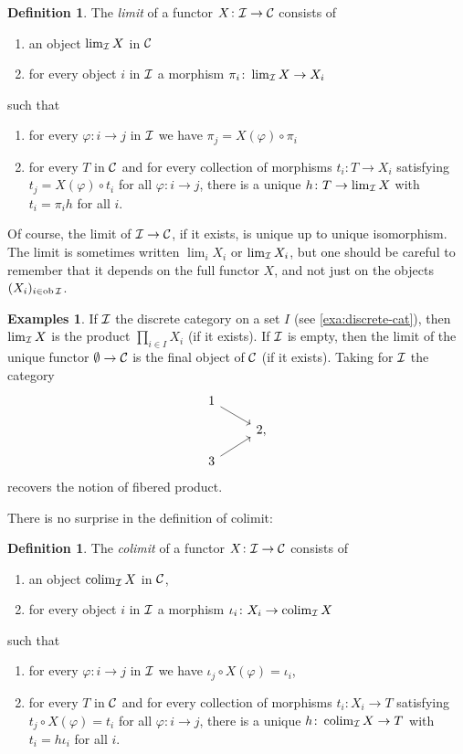 \documentclass[11pt]{amsbook}
\DeclareMathOperator\ob{ob}
\DeclareMathOperator\colim{colim}
\theoremstyle{plain}
\theoremstyle{definition}
\newtheorem{definition}[theorem]{Definition}
\newtheorem{examples}[theorem]{Examples}
\begin{document}
\begin{definition}The \emph{limit} of a functor $X\colon {\mathcal{I}} \to {\mathcal{C}}$  consists of
\begin{enumerate}
\item an object $\lim_{\mathcal{I}} X$ in ${\mathcal{C}}$
\item for every object $i$ in ${\mathcal{I}}$ a morphism $\pi_i \colon \lim_{\mathcal{I}} X \to X_i$
\end{enumerate}
such that
\begin{enumerate}
\item for every $\varphi\colon i \to j$ in ${\mathcal{I}}$ we have $\pi_j = X(\varphi) \circ \pi_i$
\item for every $T$ in ${\mathcal{C}}$ and for every collection of morphisms $t_i\colon T\to X_i$ satisfying $t_j = X(\varphi) \circ t_i$ for all $\varphi\colon i\to j$, there is a unique $h\colon T\to \lim_{\mathcal{I}} X$ with $t_i = \pi_i h$ for all $i$.
\end{enumerate}
\end{definition}

Of course, the limit of ${\mathcal{I}} \to {\mathcal{C}}$, if it exists, is unique up to unique isomorphism. The limit is sometimes written $\lim_i X_i$ or $\lim_{\mathcal{I}} X_i$, but one should be careful to remember that it depends on the full functor $X$, and not just on the objects $(X_i)_{i \in \ob \cI}$.


\begin{examples}\label{exa:three-limits}
If ${\mathcal{I}}$ the discrete category on a set $I$ (see \ref{exa:discrete-cat}), then $\lim_{\mathcal{I}} X$ is the product $\prod_{i\in I} X_i$ (if it exists). If ${\mathcal{I}}$ is empty, then the limit of the unique functor $\emptyset\to {\mathcal{C}}$ is the final object of ${\mathcal{C}}$ (if it exists). Taking for ${\mathcal{I}}$ the category
\[
\begin{tikzcd}[row sep=small]
	1 \arrow{rd} & \\  & 2, \\ 3 \arrow{ru} & 
\end{tikzcd}
\]
recovers the notion of  fibered product.  
\end{examples}


There is no surprise in the definition of colimit: 

\begin{definition}The \emph{colimit} of a functor $X\colon {\mathcal{I}} \to {\mathcal{C}}$  consists of
\begin{enumerate}
\item an object $\colim_\cI X$ in ${\mathcal{C}}$,
\item for every object $i$ in ${\mathcal{I}}$ a morphism $\iota_i \colon X_i \to \colim_\cI X$
\end{enumerate}
such that
\begin{enumerate}
\item for every $\varphi\colon i \to j$ in ${\mathcal{I}}$ we have $\iota_j \circ X(\varphi) = \iota_i$,
\item for every $T$ in ${\mathcal{C}}$ and for every collection of morphisms $t_i\colon X_i\to T$ satisfying $t_j \circ X(\varphi) = t_i$ for all $\varphi\colon i\to j$, there is a unique $h\colon \colim_\cI X\to T$ with $t_i = h \iota_i$ for all $i$.
\end{enumerate}
\end{definition}
\end{document}
